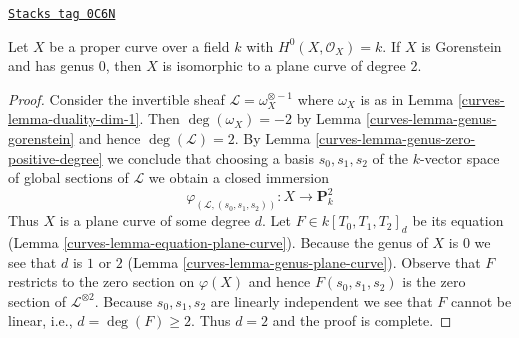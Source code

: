 \begin{lemma}
\label{curves-lemma-genus-zero}
\href{https://stacks.math.columbia.edu/tag/0C6N}{\texttt{Stacks tag 0C6N}}

Let $X$ be a proper curve over a field $k$ with $H^0(X, \mathcal{O}_X) = k$.
If $X$ is Gorenstein and has genus $0$, then $X$
is isomorphic to a plane curve of degree $2$.
\end{lemma}

\begin{proof}

Consider the invertible sheaf $\mathcal{L} = \omega_X^{\otimes -1}$ where
$\omega_X$ is as in Lemma \ref{curves-lemma-duality-dim-1}. Then
$\deg(\omega_X) = -2$ by Lemma \ref{curves-lemma-genus-gorenstein}
and hence $\deg(\mathcal{L}) = 2$. By
Lemma \ref{curves-lemma-genus-zero-positive-degree}
we conclude that choosing a basis $s_0, s_1, s_2$ of the $k$-vector
space of global sections of $\mathcal{L}$ we obtain a closed immersion
$$
\varphi_{(\mathcal{L}, (s_0, s_1, s_2))} :
X \longrightarrow \mathbf{P}^2_k
$$
Thus $X$ is a plane curve of some degree $d$. Let $F \in k[T_0, T_1, T_2]_d$
be its equation (Lemma \ref{curves-lemma-equation-plane-curve}).
Because the genus of $X$ is $0$ we see that $d$ is $1$ or $2$
(Lemma \ref{curves-lemma-genus-plane-curve}). Observe that
$F$ restricts to the zero section on $\varphi(X)$ and hence
$F(s_0, s_1, s_2)$ is the zero section of $\mathcal{L}^{\otimes 2}$.
Because $s_0, s_1, s_2$ are linearly independent we see that $F$
cannot be linear, i.e., $d = \deg(F) \geq 2$. Thus $d = 2$
and the proof is complete.
\end{proof}

